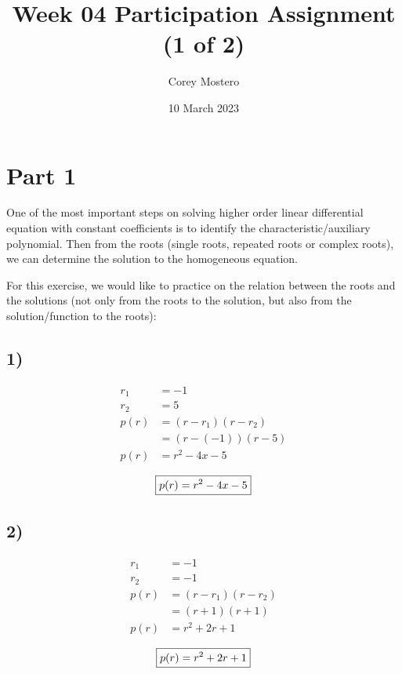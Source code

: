 \documentclass{article}
\title{Week 04 Participation Assignment (1 of 2)}
\date{10 March 2023}
\author{Corey Mostero}
\begin{document}
\newcommand{\hr}{\par\noindent\rule{\textwidth}{0.4pt}}

\newcommand{\bc}[1]{
	\begin{equation*}
		\begin{boxed}
			{#1}
		\end{boxed}
	\end{equation*}
}

\maketitle
\newpage

\tableofcontents

\section{Part 1}
One of the most important steps on solving higher order linear differential equation with constant coefficients is to identify the characteristic/auxiliary polynomial. Then from the roots (single roots, repeated roots or complex roots), we can determine the solution to the homogeneous equation.

For this exercise, we would like to practice on the relation between the roots and the solutions (not only from the roots to the solution, but also from the solution/function to the roots):

\subsection{1)}
\begin{align*}
	r_1 & = -1 \\
	r_2 & = 5 \\
	p(r) & = (r - r_1)(r - r_2) \\
		 & = (r - (-1))(r - 5) \\
	p(r) & = r^2 -4x - 5
\end{align*}
\bc{p(r) = r^2 -4x - 5}

\subsection{2)}
\begin{align*}
	r_1 & = -1 \\
	r_2 & = -1 \\
	p(r) & = (r - r_1)(r - r_2) \\
		 & = (r + 1)(r + 1) \\
	p(r) & = r^2 + 2r + 1
\end{align*}
\bc{p(r) = r^2 + 2r + 1}
\end{document}
